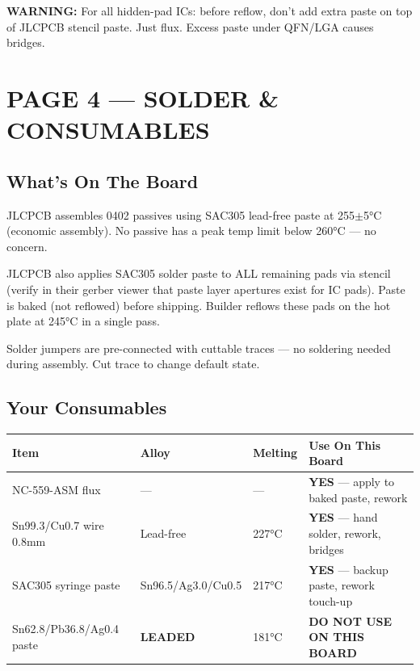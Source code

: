 \documentclass[11pt,a4paper]{article}
\newcommand{\dangerbox}[1]{\par\noindent\colorbox{danger!10}{\parbox{\dimexpr\textwidth-2\fboxsep}{%
\textcolor{danger}{\textbf{WARNING:}} #1}}\par\vspace{0.5em}}
\begin{document}
\dangerbox{For all hidden-pad ICs: before reflow, don't add extra paste on top of JLCPCB stencil paste. Just flux. Excess paste under QFN/LGA causes bridges.}

\newpage
\section*{PAGE 4 — SOLDER \& CONSUMABLES}

\subsection*{What's On The Board}

JLCPCB assembles 0402 passives using SAC305 lead-free paste at 255$\pm$5°C (economic assembly). No passive has a peak temp limit below 260°C — no concern.

JLCPCB also applies SAC305 solder paste to ALL remaining pads via stencil (verify in their gerber viewer that paste layer apertures exist for IC pads). Paste is baked (not reflowed) before shipping. Builder reflows these pads on the hot plate at 245°C in a single pass.

Solder jumpers are pre-connected with cuttable traces — no soldering needed during assembly. Cut trace to change default state.

\subsection*{Your Consumables}

\begin{table}[H]
\centering
\renewcommand{\arraystretch}{1.3}
\begin{tabular}{@{}p{3.5cm}p{3.5cm}p{1.8cm}p{5.5cm}@{}}
\toprule
\textbf{Item} & \textbf{Alloy} & \textbf{Melting} & \textbf{Use On This Board} \\
\midrule
NC-559-ASM flux & — & — & \textcolor{safe}{\textbf{YES}} — apply to baked paste, rework \\
Sn99.3/Cu0.7 wire 0.8mm & Lead-free & 227°C & \textcolor{safe}{\textbf{YES}} — hand solder, rework, bridges \\
SAC305 syringe paste & Sn96.5/Ag3.0/Cu0.5 & 217°C & \textcolor{safe}{\textbf{YES}} — backup paste, rework touch-up \\
Sn62.8/Pb36.8/Ag0.4 paste & \textcolor{danger}{\textbf{LEADED}} & 181°C & \textcolor{danger}{\textbf{DO NOT USE ON THIS BOARD}} \\
\bottomrule
\end{tabular}
\end{table}
\end{document}

